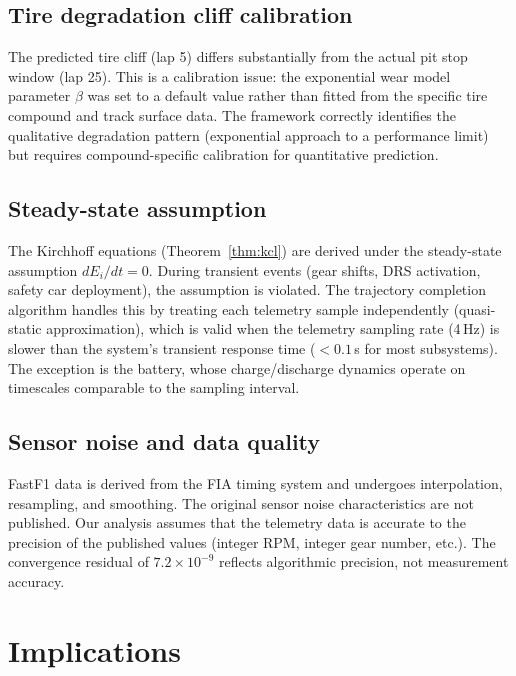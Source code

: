 \documentclass[twocolumn,10pt,a4paper]{article}
\theoremstyle{definition}
\theoremstyle{remark}
\begin{document}
\subsection{Tire degradation cliff calibration}

The predicted tire cliff (lap 5) differs substantially from the actual pit stop window (lap 25). This is a calibration issue: the exponential wear model parameter $\beta$ was set to a default value rather than fitted from the specific tire compound and track surface data. The framework correctly identifies the qualitative degradation pattern (exponential approach to a performance limit) but requires compound-specific calibration for quantitative prediction.

\subsection{Steady-state assumption}

The Kirchhoff equations (Theorem~\ref{thm:kcl}) are derived under the steady-state assumption $dE_i/dt = 0$. During transient events (gear shifts, DRS activation, safety car deployment), the assumption is violated. The trajectory completion algorithm handles this by treating each telemetry sample independently (quasi-static approximation), which is valid when the telemetry sampling rate (4\,Hz) is slower than the system's transient response time ($< 0.1$\,s for most subsystems). The exception is the battery, whose charge/discharge dynamics operate on timescales comparable to the sampling interval.

\subsection{Sensor noise and data quality}

FastF1 data is derived from the FIA timing system and undergoes interpolation, resampling, and smoothing. The original sensor noise characteristics are not published. Our analysis assumes that the telemetry data is accurate to the precision of the published values (integer RPM, integer gear number, etc.). The convergence residual of $7.2 \times 10^{-9}$ reflects algorithmic precision, not measurement accuracy.


\section{Implications}\label{sec:implications}
\end{document}
